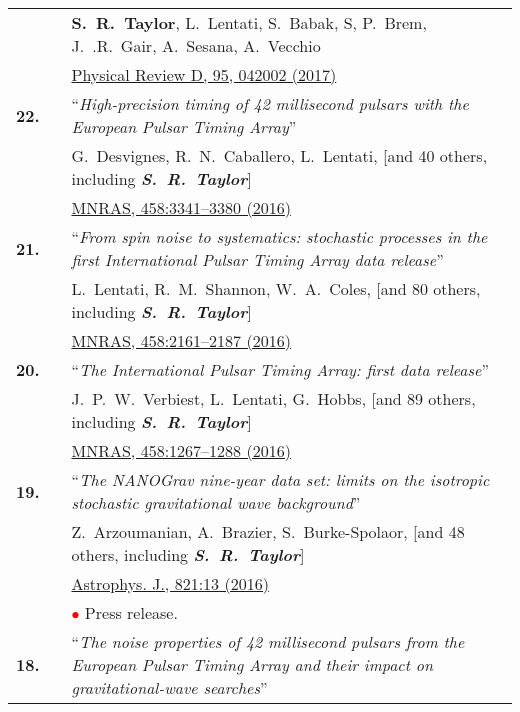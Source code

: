 \documentclass[11pt,letterpaper,sans]{moderncv}
\begin{document}
{\begin{longtable}{rp{0.3cm}p{15.8cm}}
&& \textbf{S.~R.~Taylor},  L.~Lentati, S.~Babak, S, P.~Brem, J.~.R.~Gair, A.~Sesana, A.~Vecchio \\ 
&&  \href{https://journals.aps.org/prd/abstract/10.1103/PhysRevD.95.042002}{{\color{color1} Physical Review D, 95, 042002 (2017)}} \vspace{0.09cm}\\
\textbf{22.} & & ``\textit{High-precision timing of 42 millisecond pulsars with the European Pulsar Timing Array}'' \\ 
&& G.~Desvignes, R.~N.~Caballero, L.~Lentati, [and 40 others, including \textit{\textbf{S.~R.~Taylor}}] \\ 
&&  \href{http://mnras.oxfordjournals.org/content/458/3/3341}{{\color{color1} MNRAS, 458:3341--3380 (2016)}} \vspace{0.09cm}\\
\textbf{21.} & & ``\textit{From spin noise to systematics: stochastic processes in the first International Pulsar Timing Array data release}'' \\ 
&& L.~Lentati, R.~M.~Shannon, W.~A.~Coles, [and 80 others, including \textit{\textbf{S.~R.~Taylor}}] \\ 
&&  \href{http://mnras.oxfordjournals.org/content/458/2/2161}{{\color{color1} MNRAS, 458:2161--2187 (2016)}} \vspace{0.09cm}\\
\textbf{20.} & & ``\textit{The International Pulsar Timing Array: first data release}'' \\ 
&& J.~P.~W.~Verbiest, L.~Lentati, G.~Hobbs, [and 89 others, including \textit{\textbf{S.~R.~Taylor}}] \\ 
&&  \href{http://mnras.oxfordjournals.org/content/458/2/1267}{{\color{color1} MNRAS, 458:1267--1288 (2016)}} \vspace{0.09cm}\\
\textbf{19.} & & ``\textit{The NANOGrav nine-year data set: limits on the isotropic stochastic gravitational wave background}'' \\ 
&& Z.~Arzoumanian, A.~Brazier, S.~Burke-Spolaor, [and 48 others, including \textit{\textbf{S.~R.~Taylor}}] \\ 
&&  \href{http://iopscience.iop.org/article/10.3847/0004-637X/821/1/13/meta}{{\color{color1} Astrophys. J., 821:13 (2016)}} \\
&& \textcolor{red}{$\bullet$} Press release. \vspace{0.09cm}\\
\textbf{18.} & & ``\textit{The noise properties of 42 millisecond pulsars from the European Pulsar Timing Array and their impact on gravitational-wave searches}'' \\ 

\end{longtable}}
\end{document}
